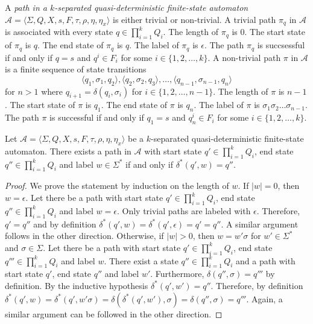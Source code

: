 \begin{definition}
  A \emph{path in a $k$-separated quasi-deterministic finite-state automaton}
  $\mathcal{A} = \langle \Sigma, Q, X, s, F, \tau, \rho, \eta, \eta_x \rangle$ is
  either trivial or non-trivial. A trivial path $\pi_q$ in $\mathcal{A}$ is
  associated with every state $q \in \prod_{i=1}^k Q_i$. The length of $\pi_q$ is $0$.
  The start state of $\pi_q$ is $q$. The end state of $\pi_q$ is $q$. The label of
  $\pi_q$ is $\epsilon$. The path $\pi_q$ is succsessful if and only if $q = s$ and
  $q^i \in F_i$ for some $i \in \{ 1, 2, \ldots, k \}$. A non-trivial path $\pi$ in
  $\mathcal{A}$ is a finite sequence of state transitions
  \begin{equation*}
    \langle q_1, \sigma_1, q_2 \rangle, \langle q_2, \sigma_2, q_3 \rangle, \dots,
    \langle q_{n-1}, \sigma_{n-1}, q_n \rangle
  \end{equation*}
  for $n > 1$ where $q_{i+1} = \delta(q_i, \sigma_i)$ for $i \in \{ 1, 2, \ldots, n-1
  \}$. The length of $\pi$ is $n-1$. The start state of $\pi$ is $q_1$. The end state
  of $\pi$ is $q_n$. The label of $\pi$ is $\sigma_1 \sigma_2 \ldots \sigma_{n-1}$.
  The path $\pi$ is successful if and only if $q_1 = s$ and $q_n^i \in F_i$ for some
  $i \in \{ 1, 2, \ldots, k \}$.
\end{definition}

\begin{proposition}
  Let $\mathcal{A} = \langle \Sigma, Q, X, s, F, \tau, \rho, \eta, \eta_x \rangle$ be
  a $k$-separated quasi-deterministic finite-state automaton. There exists a path in
  $\mathcal{A}$ with start state $q' \in \prod_{i=1}^k Q_i$, end state $q'' \in
  \prod_{i=1}^k Q_i$ and label $w \in \Sigma^*$ if and only if $\delta^*(q', w) = q''$.
\end{proposition}

\begin{proof}
  We prove the statement by induction on the length of $w$. If $|w| = 0$, then $w =
  \epsilon$. Let there be a path with start state $q' \in \prod_{i=1}^k Q_i$, end state
  $q'' \in \prod_{i=1}^k Q_i$ and label $w = \epsilon$. Only trivial paths are labeled
  with $\epsilon$. Therefore, $q' = q''$ and by definition $\delta^*(q', w) =
  \delta^*(q', \epsilon) = q' = q''$. A similar argument follows in the other
  direction. Otherwise, if $|w| > 0$, then $w = w'\sigma$ for $w' \in \Sigma^*$ and
  $\sigma \in \Sigma$. Let there be a path with start state $q' \in \prod_{i=1}^k Q_i$,
  end state $q''' \in \prod_{i=1}^k Q_i$ and label $w$. There exist a state $q'' \in
  \prod_{i=1}^k Q_i$ and a path with start state $q'$, end state $q''$ and label $w'$.
  Furthermore, $\delta(q'', \sigma) = q'''$ by definition. By the inductive
  hypothesis $\delta^*(q', w') = q''$. Therefore, by definition $\delta^*(q', w) =
  \delta^*(q', w'\sigma) = \delta(\delta^*(q', w'), \sigma) = \delta(q'', \sigma) =
  q'''$. Again, a similar argument can be followed in the other direction.
\end{proof}

